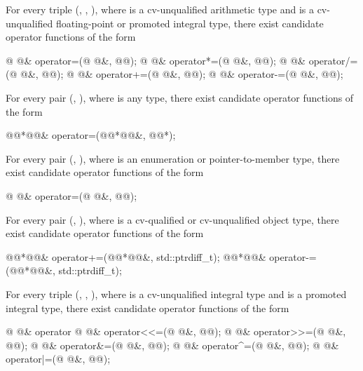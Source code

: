 \pnum
For every triple
(, , ),
where  is a cv-unqualified arithmetic type
and  is
a cv-unqualified floating-point or promoted integral type,
there exist candidate operator functions of the form
\begin{codeblock}
@ @&   operator=(@ @&, @@);
@ @&   operator*=(@ @&, @@);
@ @&   operator/=(@ @&, @@);
@ @&   operator+=(@ @&, @@);
@ @&   operator-=(@ @&, @@);
\end{codeblock}

\pnum
For every pair (, ),
where  is any type,
there exist candidate operator functions of the form
\begin{codeblock}
@@*@@&   operator=(@@*@@&, @@*);
\end{codeblock}

\pnum
For every pair
(,
),
where
is an enumeration or pointer-to-member type,
there exist candidate operator functions of the form
\begin{codeblock}
@ @&   operator=(@ @&, @@);
\end{codeblock}

\pnum
For every pair
(,
),
where
is a cv-qualified or cv-unqualified object type,
there exist candidate operator functions of the form
\begin{codeblock}
@@*@@&   operator+=(@@*@@&, std::ptrdiff_t);
@@*@@&   operator-=(@@*@@&, std::ptrdiff_t);
\end{codeblock}

\pnum
For every triple
(,
,
),
where
is a cv-unqualified integral type and
is a promoted integral type,
there exist candidate operator functions of the form
\begin{codeblock}
@ @&   operator%
@ @&   operator<<=(@ @&, @@);
@ @&   operator>>=(@ @&, @@);
@ @&   operator&=(@ @&, @@);
@ @&   operator^=(@ @&, @@);
@ @&   operator|=(@ @&, @@);
\end{codeblock}

